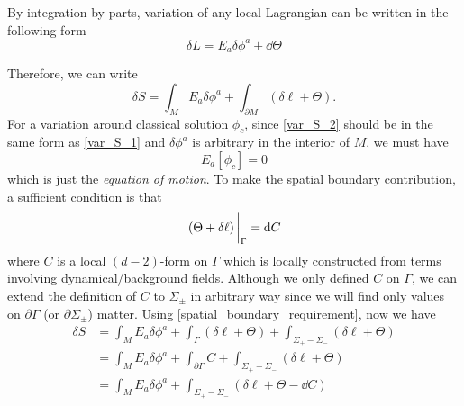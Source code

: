\documentclass[10pt]{article}
\begin{document}
By integration by parts, variation of any local Lagrangian can be written in the following form
\begin{equation}
    \delta L=E_a\delta \phi^a+\dd{\Theta}
\end{equation}

Therefore, we can write
\begin{equation}
    \delta S=\int_M E_a\delta\phi^a+\int_{\partial M}\left(\delta\ell+\Theta\right).\label{var_S_2}
\end{equation}
For a variation around classical solution $\phi_c$, since \cref{var_S_2} should be in the same form as \cref{var_S_1} and $\delta\phi^a$ is arbitrary in the interior of $M$, we must have
\begin{equation}
    E_a[\phi_c]=0
\end{equation}
which is just the \textit{equation of motion}.
To make the spatial boundary contribution, a sufficient condition is that
\begin{equation}\label{spatial_boundary_requirement}
    \eval{\left(\Theta+\delta\ell\right)}_\Gamma=\dd{C}
\end{equation}
where $C$ is a local $(d-2)$-form on $\Gamma$ which is locally constructed from terms involving dynamical/background fields.
Although we only defined $C$ on $\Gamma$, we can extend the definition of $C$ to $\Sigma_{\pm}$ in arbitrary way since we will find only values on $\partial\Gamma$ (or $\partial\Sigma_{\pm}$) matter.
Using \cref{spatial_boundary_requirement}, now we have
\begin{equation}\label{delta_S_1}
    \begin{split}
        \delta S&=\int_M E_a\delta\phi^a+\int_{\Gamma}\left(\delta\ell+\Theta\right)+\int_{\Sigma_+-\Sigma_-}\left(\delta\ell+\Theta\right)\\
        &=\int_M E_a\delta\phi^a+\int_{\partial\Gamma}C+\int_{\Sigma_+-\Sigma_-}\left(\delta\ell+\Theta\right)\\
        &=\int_M E_a\delta\phi^a+\int_{\Sigma_+-\Sigma_-}\left(\delta\ell+\Theta-\dd{C}\right)
    \end{split}
\end{equation}
\end{document}
